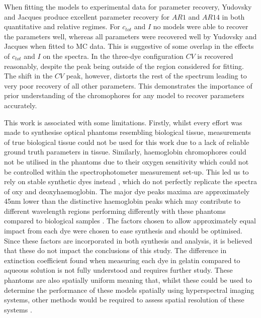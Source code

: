 When fitting the models to experimental data for parameter recovery, Yudovsky and Jacques produce excellent parameter recovery for $AR1$ and $AR14$ in both quantitative and relative regimes. For $c_{tot}$ and $I$ no models were able to recover the parameters well, whereas all parameters were recovered well by Yudovsky and Jacques when fitted to MC data. This is suggestive of some overlap in the effects of $c_{tot}$ and $I$ on the spectra. In the three-dye configuration $CV$ is recovered reasonably, despite the peak being outside of the region considered for fitting. The shift in the $CV$ peak, however, distorts the rest of the spectrum leading to very poor recovery of all other parameters. This demonstrates the importance of prior understanding of the chromophores for any model to recover parameters accurately. 

This work is associated with some limitations.
Firstly, whilst every effort was made to synthesise optical phantoms resembling biological tissue, measurements of true biological tissue could not be used for this work due to a lack of reliable ground truth parameters in tissue. %
Similarly, haemoglobin chromophores could not be utilised in the phantoms due to their oxygen sensitivity which could not be controlled within the spectrophotometer measurement set-up. This led us to rely on stable synthetic dyes instead
, which do not perfectly replicate the spectra of oxy and deoxyhaemoglobin. The major dye peaks maxima are approximately 45nm lower than the distinctive haemoglobin peaks which may contribute to different wavelength regions performing differently with these phantoms compared to biological samples
. 
The factors chosen to allow approximately equal impact from each dye were chosen to ease synthesis and should be optimised. Since these factors are incorporated in both synthesis and analysis, it is believed that these do not impact the conclusions of this study.
The difference in extinction coefficient found when measuring each dye in gelatin compared to aqueous solution is not fully understood and requires further study.
These phantoms are also spatially uniform meaning that, whilst these could be used to determine the performance of these models spatially using hyperspectral imaging systems, other methods would be required to assess spatial resolution of these systems \cite{EdmundOptics2023, Torkildsen2018}.
